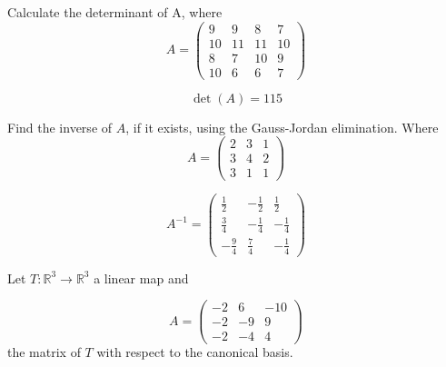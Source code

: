 \begin{questions}

\question Calculate the determinant of A, where
$$
A=\left(\begin{array}{rrrr}
9 & 9 & 8 & 7 \\
10 & 11 & 11 & 10 \\
8 & 7 & 10 & 9 \\
10 & 6 & 6 & 7
\end{array}\right)
$$

\begin{solution}
$$\det(A)=115$$
\end{solution}

\question Find the inverse of $A$, if it exists, using the Gauss-Jordan elimination. Where
$$
A=\left(\begin{array}{rrr}
2 & 3 & 1 \\
3 & 4 & 2 \\
3 & 1 & 1
\end{array}\right)
$$

\begin{solution}
$$A^{-1}=\left(\begin{array}{rrr}
\frac{1}{2} & -\frac{1}{2} & \frac{1}{2} \\
\frac{3}{4} & -\frac{1}{4} & -\frac{1}{4} \\
-\frac{9}{4} & \frac{7}{4} & -\frac{1}{4}
\end{array}\right)$$
\end{solution}

\question Let $T:\mathbb{R}^3\rightarrow\mathbb{R}^3$  a linear map and
 
$$
A=\left(\begin{array}{rrr}
-2 & 6 & -10 \\
-2 & -9 & 9 \\
-2 & -4 & 4
\end{array}\right)
$$
the matrix of $T$ with respect to the canonical basis.
\end{questions}
